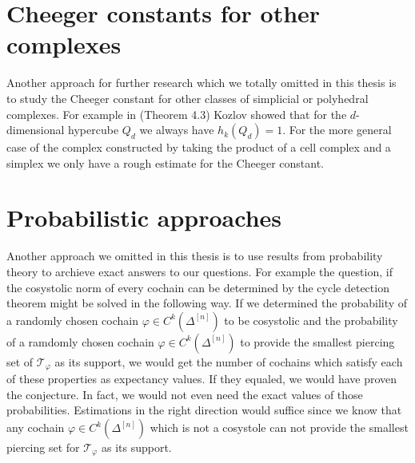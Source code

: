 \section{Cheeger constants for other complexes}

Another approach for further research which we totally omitted in this thesis is to study the Cheeger constant for other classes of simplicial or polyhedral complexes. For example in \cite{6} (Theorem 4.3) Kozlov showed that for the \(d\)-dimensional hypercube \(Q_d\) we always have \(h_k(Q_d)=1\). For the more general case of the complex constructed by taking the product of a cell complex and a simplex we only have a rough estimate for the Cheeger constant.

\section{Probabilistic approaches}

Another approach we omitted in this thesis is to use results from probability theory to archieve exact answers to our questions. For example the question, if the cosystolic norm of every cochain can be determined by the cycle detection theorem might be solved in the following way. If we determined the probability of a randomly chosen cochain \(\varphi\in C^k(\Delta^{[n]})\) to be cosystolic and the probability of a ramdomly chosen cochain \(\varphi\in C^k(\Delta^{[n]})\) to provide the smallest piercing set of \(\mathcal{T}_{\varphi}\) as its support, we would get the number of cochains which satisfy each of these properties as expectancy values. If they equaled, we would have proven the conjecture. In fact, we would not even need the exact values of those probabilities. Estimations in the right direction would suffice since we know that any cochain \(\varphi\in C^k(\Delta^{[n]})\) which is not a cosystole can not provide the smallest piercing set for \(\mathcal{T}_{\varphi}\) as its support.